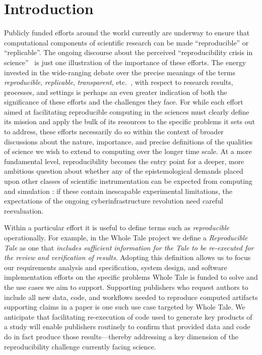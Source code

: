 
\section{Introduction}

Publicly funded efforts around the world currently are underway to
	ensure that computational components of scientific research
	can be made ``reproducible'' or ``replicable''.
The ongoing discourse about the perceived ``reproducibility crisis in science''~\cite{fanelli_opinion:_2018}
	is just one illustration of the importance of these efforts.
The energy invested in the wide-ranging debate over the precise meanings of the
	terms \emph{reproducible}, \emph{replicable},
        \emph{transparent}, etc.\
        \cite{drummond2009replicability,carolegoble2016what,freire2016reproducibilitya,goodman2016what,ioannidis2017reproducibility,herouxtoward,plesser2018reproducibility,barba2018terminologies,committeeonreproducibilityandreplicabilityinscience2019reproducibility}, with
	respect to research results, processes, and settings is perhaps an even greater indication of
	both the significance of these efforts and the challenges they face.
For while each effort aimed at facilitating reproducible computing in the
	sciences must clearly define its mission and apply the bulk of its resources
	to the specific problems it sets out to address, these efforts necessarily do
	so within the context of broader discussions about the nature, importance,
	and precise definitions of the qualities of science we wish to extend to computing
	over the longer time scale. At a more fundamental level, reproducibility becomes the entry
    point for a deeper, more ambitious question about whether any of the epistemological
    demands placed upon other classes of scientific instrumentation can be expected from
    computing and simulation \cite{winsberg1999sanctioning}: if these contain inescapable
    experimental limitations, the expectations of the ongoing cyberinfrastructure revolution
    \cite{atkins2003revolutionizing} need careful reevaluation.

Within a particular effort it is useful to define terms such as \emph{reproducible} operationally.
For example, in the Whole Tale project \cite{WT2019,brinckman2019computing} we define a \emph{Reproducible Tale} as one
	that \emph{includes sufficient information for the Tale to be re-executed for the review
	and verification of results}.
Adopting this definition allows us to focus our requirements analysis and specification,
    system design,
	and software implementation efforts on the specific problems Whole Tale is funded to solve
	and the use cases we aim to support.
Supporting publishers who request authors to include all new data,
	code, and workflows needed to reproduce computed artifacts supporting
	claims in a paper is one such use case targeted by Whole Tale.
We anticipate that facilitating re-execution of code used to generate
	key products of a study will enable publishers routinely to confirm that
	provided data and code do in fact produce those results---thereby addressing
	a key dimension of the reproducibility challenge currently facing science.

